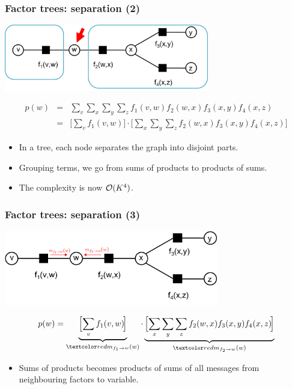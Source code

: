 \begin{frame}
\frametitle{Factor trees: separation (2)}

\centerline{\includegraphics[width=0.67\textwidth]{ExampleFactorGraph2}
}
\begin{eqnarray*}
p(w) &=& \sum_v\sum_x\sum_y\sum_z f_1(v,w)f_2(w,x)f_3(x,y)f_4(x,z) \\
& = & \Big[\!\sum_v f_1(v,w)\!\Big] \cdot
\Big[\!\sum_x\sum_y\sum_z f_2(w,x)f_3(x,y)f_4(x,z)\!\Big]
\end{eqnarray*}
\begin{itemize}
\item In a tree, each node separates the graph into disjoint parts.
\item Grouping terms, we go from sums of products to
  products of sums. 
\item The complexity is now ${\cal O}(K^4)$.
\end{itemize}


\end{frame}

\begin{frame}
\frametitle{Factor trees: separation (3)}

\centerline{\includegraphics[width=0.7\textwidth]{ExampleFactorGraph3}
}
\[
p(w) = \underbrace{\Big[\!\sum_v f_1(v,w)\!\Big]}_{\Red{m_{f_1\rightarrow w}(w)}}
\cdot
\underbrace{\Big[\!\sum_x\sum_y\sum_z f_2(w,x)f_3(x,y)f_4(x,z)\!\Big]}_{
\Red{m_{f_2\rightarrow w}(w)}}
\]
\begin{itemize}
\item Sums of products becomes products of sums of all messages from
neighbouring factors to variable.
\end{itemize}

\hfill

\end{frame}


